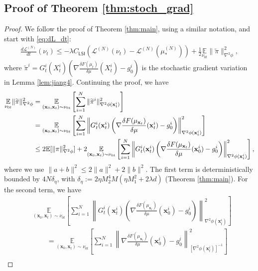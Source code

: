 \documentclass{article}
\newcommand{\CLSI}[0]{C_{\mathsf{LSI}}}
\newcommand{\E}[0]{\mathbb{E}}
\begin{document}
\subsection{Proof of Theorem \ref{thm:stoch_grad}}\label{app:thm_stoch_grad}
\begin{proof}
    We follow the proof of Theorem \ref{thm:main}, using a similar notation, and start with \eqref{eq:dL_dt}:\begin{align}
        \frac{d\mathcal{L}^{(N)}}{dt}(\nu_t) \le -\lambda\CLSI\left(\mathcal{L}^{(N)}(\nu_t) - \mathcal{L}^{(N)}(\mu_*^{(N)})\right) + \frac{1}{2}\underset{\nu_{0t}}{\mathbb{E}}\|\widetilde{\pi}\|^2_{\nabla^2\phi},\label{eq:dL_dt_stoch}
    \end{align}
    where 
    $\widetilde{\pi}^i = G_t^i(X_t^i)\left(\nabla\frac{\delta F(\mu_t)}{\delta\mu}(X_t^i)-g_0^i\right)$
    is the stochastic gradient variation in Lemma \ref{lem:jiang4}. Continuing the proof, we have 
    \begin{align}
    \underset{\nu_{0t}}{\mathbb{E}}\|\widetilde{\pi}\|^2_{\nabla^2\phi} &=\underset{(\mathbf{x}_0,\mathbf{x}_t)\sim\nu_{0t}}{\mathbb{E}} \left[\sum_{i=1}^N\|\widetilde{\pi}^i\|_{\nabla^2\phi(\mathbf{x}_t^i)}^2\right]\notag \\
    &= \underset{(\mathbf{x}_0,\mathbf{x}_t)\sim\nu_{0t}}{\mathbb{E}} \left[\sum_{i=1}^N\left\|G_t^i(\mathbf{x}_t^i)\left(\nabla\frac{\delta F(\mu_{\mathbf{x}_t})}{\delta\mu}(\mathbf{x}_t^i)-g_0^i\right)\right\|_{\nabla^2\phi(\mathbf{x}_t^i)}^2\right]\notag\\
    &\le 2\E[\|\pi\|_{\nabla^2\phi}^2] + 2\underset{(\mathbf{x}_0,\mathbf{x}_t)\sim\nu_{0t}}{\mathbb{E}} \left[\sum_{i=1}^N\left\|G_t^i(\mathbf{x}_t^i)\left(\nabla\frac{\delta F(\mu_{\mathbf{x}_t})}{\delta\mu}(\mathbf{x}_0^i)-g_0^i\right)\right\|_{\nabla^2\phi(\mathbf{x}_t^i)}^2\right],\notag
\end{align}
where we use $\|a+b\|^2\le 2\|a\|^2+2\|b\|^2$. The first term is deterministically bounded by $4N\delta_\eta$, with $\delta_\eta:=2\eta M_2^4M(\eta M_1^2 + 2\lambda d)$ (Theorem \ref{thm:main}). For the second term, we have \begin{align*}
    &\underset{(\mathbf{x}_0,\mathbf{x}_t)\sim\nu_{0t}}{\mathbb{E}} \left[\sum_{i=1}^N\left\|G_t^i(\mathbf{x}_t^i)\left(\nabla\frac{\delta F(\mu_{\mathbf{x}_t})}{\delta\mu}(\mathbf{x}_0^i)-g_0^i\right)\right\|_{\nabla^2\phi(\mathbf{x}_t^i)}^2\right]\\
    &\qquad= \underset{(\mathbf{x}_0,\mathbf{x}_t)\sim\nu_{0t}}{\mathbb{E}} \left[\sum_{i=1}^N\left\|\nabla\frac{\delta F(\mu_{\mathbf{x}_t})}{\delta\mu}(\mathbf{x}_0^i)-g_0^i\right\|_{[\nabla^2\phi(\mathbf{x}_t^i)]^{-1}}^2\right]\\

\end{align*}
\end{proof}
\end{document}
